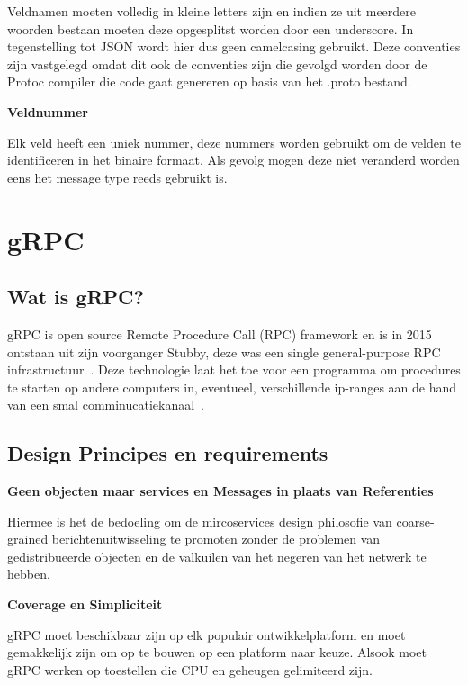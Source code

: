 Veldnamen moeten volledig in kleine letters zijn en indien ze uit meerdere woorden bestaan moeten deze opgesplitst worden door een underscore. In tegenstelling tot JSON wordt hier dus geen camelcasing gebruikt. Deze conventies zijn vastgelegd omdat dit ook de conventies zijn die gevolgd worden door de Protoc compiler die code gaat genereren op basis van het .proto bestand.

\textbf{Veldnummer}

Elk veld heeft een uniek nummer, deze nummers worden gebruikt om de velden te identificeren in het binaire formaat. Als gevolg mogen deze niet veranderd worden eens het message type reeds gebruikt is.

\section{gRPC}
\label{sec:gRPC}

\subsection{Wat is gRPC?}
\label{subsec:Wat is gRPC?}

gRPC is open source Remote Procedure Call (RPC) framework en is in 2015 ontstaan uit zijn voorganger Stubby, deze was een single general-purpose RPC infrastructuur~\autocite{gRPC}. Deze technologie laat het toe voor een programma om procedures te starten op andere computers in, eventueel, verschillende ip-ranges aan de hand van een smal comminucatiekanaal~\autocite{Nelson1981}.

\subsection{Design Principes en requirements}
\label{subsec: Design Principes en requirements}

\textbf{Geen objecten maar services en Messages in plaats van Referenties}

Hiermee is het de bedoeling om de mircoservices design philosofie van coarse-grained berichtenuitwisseling te promoten zonder de problemen van gedistribueerde objecten \autocite{FowlerDisObj} en de valkuilen van het negeren van het netwerk \autocite{GalOz2008} te hebben.

\textbf{Coverage en Simpliciteit}

gRPC moet beschikbaar zijn op elk populair ontwikkelplatform en moet gemakkelijk zijn om op te bouwen op een platform naar keuze. Alsook moet gRPC werken op toestellen die CPU en geheugen gelimiteerd zijn.

